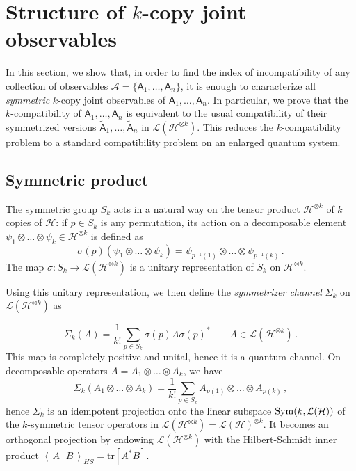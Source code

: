 \documentclass[12pt]{amsart}
\theoremstyle{definition}
\newcommand{\hh}{\mathcal{H}} %
\newcommand{\lh}{\mathcal{L(H)}} %
\newcommand{\elle}[1]{\mathcal{L}(#1)} %
\newcommand{\ip}[2]{\left\langle\,#1\,|\,#2\,\right\rangle} %
\newcommand{\tr}[1]{\mathrm{tr}\left[#1\right]} %
\newcommand{\A}{\mathsf{A}}%
\newcommand{\tA}{A}
\newcommand{\tB}{B}
\newcommand{\Sym}{{\rm Sym}}
\begin{document}
\section{Structure of $k$-copy joint observables}
\label{sec:structure}

In this section, we show that, in order to find the index of incompatibility of any collection of observables $\mathcal{A} = \{\A_1,\ldots,\A_n\}$, it is enough to characterize all {\em symmetric} $k$-copy joint observables of $\A_1,\ldots,\A_n$. In particular, we prove that the $k$-compatibility of $\A_1,\ldots,\A_n$ is equivalent to the usual compatibility of their symmetrized versions $\widetilde{\A}_1,\ldots,\widetilde{\A}_n$ in $\elle{\hh^{\otimes k}}$. This reduces the $k$-compatibility problem to a standard compatibility problem on an enlarged quantum system.

\subsection{Symmetric product}

The symmetric group $S_k$ acts in a natural way on the tensor product $\hh^{\otimes k}$ of $k$ copies of $\hh$: if $p\in S_k$ is any permutation, its action on a decomposable element $\psi_1\otimes\ldots\otimes\psi_k\in\hh^{\otimes k}$ is defined as
$$
\sigma(p)(\psi_1\otimes\ldots\otimes\psi_k) = \psi_{p^{-1}(1)}\otimes\ldots\otimes\psi_{p^{-1}(k)} \,.
$$
The map $\sigma:S_k\to\elle{\hh^{\otimes k}}$ is a unitary representation of $S_k$ on $\hh^{\otimes k}$.
 
Using this unitary representation, we then define the {\em symmetrizer channel} $\Sigma_k$ on $\elle{\hh^{\otimes k}}$ as

\begin{equation*}
\Sigma_k(\tA) = \frac{1}{k!} \sum_{p\in S_k}\sigma(p)\tA\sigma(p)^* \qquad \tA\in\elle{\hh^{\otimes k}} \, .
\end{equation*}
This map is completely positive and unital, hence it is a quantum channel. On decomposable operators $\tA = A_1\otimes\ldots\otimes A_k$, we have
$$
\Sigma_k(A_1\otimes\ldots\otimes A_k) = \frac{1}{k!} \sum_{p\in S_k} A_{p(1)}\otimes\ldots\otimes A_{p(k)} \,,
$$
hence $\Sigma_k$ is an idempotent projection onto the linear subspace $\Sym(k,\lh)$ of the $k$-symmetric tensor operators in $\elle{\hh^{\otimes k}} = \lh^{\otimes k}$. It becomes an orthogonal projection by endowing $\elle{\hh^{\otimes k}}$ with the Hilbert-Schmidt inner product $\ip{\tA}{\tB}_{HS} = \tr{\tA^*\tB}$.
\end{document}
